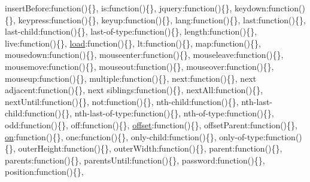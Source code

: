 \begin{DoxyCompactItemize}
\textquotesingle{}insert\+Before\textquotesingle{}\+:function()\{\}, \textquotesingle{}is\textquotesingle{}\+:function()\{\}, \textquotesingle{}jquery\textquotesingle{}\+:function()\{\}, \textquotesingle{}keydown\textquotesingle{}\+:function()\{\}, \textquotesingle{}keypress\textquotesingle{}\+:function()\{\}, \textquotesingle{}keyup\textquotesingle{}\+:function()\{\}, \textquotesingle{}lang\textquotesingle{}\+:function()\{\}, \textquotesingle{}last\textquotesingle{}\+:function()\{\}, \textquotesingle{}last-\/child\textquotesingle{}\+:function()\{\}, \textquotesingle{}last-\/of-\/type\textquotesingle{}\+:function()\{\}, \textquotesingle{}length\textquotesingle{}\+:function()\{\}, \textquotesingle{}live\textquotesingle{}\+:function()\{\}, \textquotesingle{}\hyperlink{_scripts_2jquery-1_810_82_8js_a8d0b9ec82c308161432f1c387d2fc2a7}{load}\textquotesingle{}\+:function()\{\}, \textquotesingle{}lt\textquotesingle{}\+:function()\{\}, \textquotesingle{}map\textquotesingle{}\+:function()\{\}, \textquotesingle{}mousedown\textquotesingle{}\+:function()\{\}, \textquotesingle{}mouseenter\textquotesingle{}\+:function()\{\}, \textquotesingle{}mouseleave\textquotesingle{}\+:function()\{\}, \textquotesingle{}mousemove\textquotesingle{}\+:function()\{\}, \textquotesingle{}mouseout\textquotesingle{}\+:function()\{\}, \textquotesingle{}mouseover\textquotesingle{}\+:function()\{\}, \textquotesingle{}mouseup\textquotesingle{}\+:function()\{\}, \textquotesingle{}multiple\textquotesingle{}\+:function()\{\}, \textquotesingle{}next\textquotesingle{}\+:function()\{\}, \textquotesingle{}next adjacent\textquotesingle{}\+:function()\{\}, \textquotesingle{}next siblings\textquotesingle{}\+:function()\{\}, \textquotesingle{}next\+All\textquotesingle{}\+:function()\{\}, \textquotesingle{}next\+Until\textquotesingle{}\+:function()\{\}, \textquotesingle{}not\textquotesingle{}\+:function()\{\}, \textquotesingle{}nth-\/child\textquotesingle{}\+:function()\{\}, \textquotesingle{}nth-\/last-\/child\textquotesingle{}\+:function()\{\}, \textquotesingle{}nth-\/last-\/of-\/type\textquotesingle{}\+:function()\{\}, \textquotesingle{}nth-\/of-\/type\textquotesingle{}\+:function()\{\}, \textquotesingle{}odd\textquotesingle{}\+:function()\{\}, \textquotesingle{}off\textquotesingle{}\+:function()\{\}, \textquotesingle{}\hyperlink{_scripts_2jquery-1_810_82_8js_a4a9f594d20d927164551fc7fa4751a2f}{offset}\textquotesingle{}\+:function()\{\}, \textquotesingle{}offset\+Parent\textquotesingle{}\+:function()\{\}, \textquotesingle{}\hyperlink{_scripts_2jquery-1_810_82_8min_8js_a9d5fa4fe98b38569490d55d1a97b0f72}{on}\textquotesingle{}\+:function()\{\}, \textquotesingle{}one\textquotesingle{}\+:function()\{\}, \textquotesingle{}only-\/child\textquotesingle{}\+:function()\{\}, \textquotesingle{}only-\/of-\/type\textquotesingle{}\+:function()\{\}, \textquotesingle{}outer\+Height\textquotesingle{}\+:function()\{\}, \textquotesingle{}outer\+Width\textquotesingle{}\+:function()\{\}, \textquotesingle{}parent\textquotesingle{}\+:function()\{\}, \textquotesingle{}parents\textquotesingle{}\+:function()\{\}, \textquotesingle{}parents\+Until\textquotesingle{}\+:function()\{\}, \textquotesingle{}password\textquotesingle{}\+:function()\{\}, \textquotesingle{}position\textquotesingle{}\+:function()\{\}, 
\end{DoxyCompactItemize}
